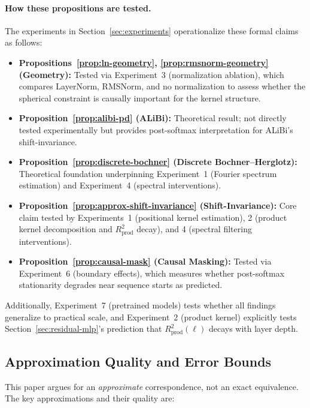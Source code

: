 \documentclass[11pt]{article}
\theoremstyle{definition}
\begin{document}
\paragraph{How these propositions are tested.}
The experiments in Section~\ref{sec:experiments} operationalize these formal claims as follows:
\begin{itemize}
    \item \textbf{Propositions~\ref{prop:ln-geometry}, \ref{prop:rmsnorm-geometry} (Geometry):} Tested via Experiment~3 (normalization ablation), which compares LayerNorm, RMSNorm, and no normalization to assess whether the spherical constraint is causally important for the kernel structure.
    \item \textbf{Proposition~\ref{prop:alibi-pd} (ALiBi):} Theoretical result; not directly tested experimentally but provides post-softmax interpretation for ALiBi's shift-invariance.
    \item \textbf{Proposition~\ref{prop:discrete-bochner} (Discrete Bochner--Herglotz):} Theoretical foundation underpinning Experiment~1 (Fourier spectrum estimation) and Experiment~4 (spectral interventions).
    \item \textbf{Proposition~\ref{prop:approx-shift-invariance} (Shift-Invariance):} Core claim tested by Experiments~1 (positional kernel estimation), 2 (product kernel decomposition and $R^2_{\text{prod}}$ decay), and 4 (spectral filtering interventions).
    \item \textbf{Proposition~\ref{prop:causal-mask} (Causal Masking):} Tested via Experiment~6 (boundary effects), which measures whether post-softmax stationarity degrades near sequence starts as predicted.
\end{itemize}
Additionally, Experiment~7 (pretrained models) tests whether all findings generalize to practical scale, and Experiment~2 (product kernel) explicitly tests Section~\ref{sec:residual-mlp}'s prediction that $R^2_{\text{prod}}(\ell)$ decays with layer depth.

\subsection{Approximation Quality and Error Bounds}

This paper argues for an \emph{approximate} correspondence, not an exact equivalence. The key approximations and their quality are:
\end{document}
